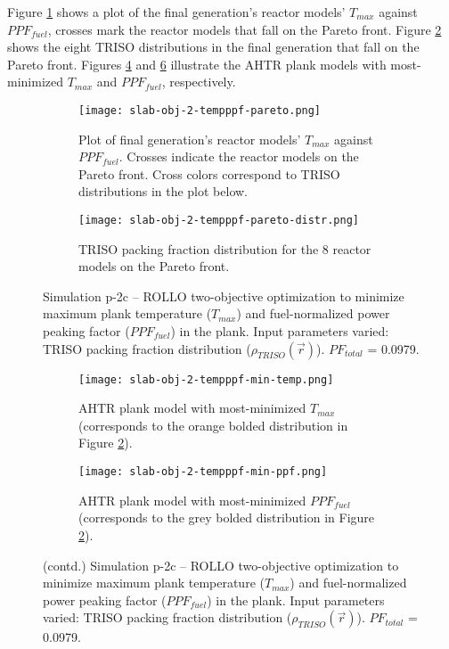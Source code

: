 Figure \ref{fig:slab-obj-2-tempppf-pareto} shows a plot of the final generation's 
reactor models' $T_{max}$ against $PPF_{fuel}$, crosses mark the reactor models that 
fall on the Pareto front.
Figure \ref{fig:slab-obj-2-tempppf-pareto-distr} shows the eight TRISO distributions in 
the final generation that fall on the Pareto front. 
Figures \ref{fig:slab-obj-2-tempppf-min-temp} and \ref{fig:slab-obj-2-tempppf-min-ppf} 
illustrate the \gls{AHTR} plank models with most-minimized $T_{max}$ and 
$PPF_{fuel}$, respectively. 
\begin{figure}[htbp!]
    \centering
    \begin{subfigure}{\textwidth}
        \texttt{[image: slab-obj-2-tempppf-pareto.png]}
        \caption{Plot of final generation's reactor models' $T_{max}$ against 
        $PPF_{fuel}$. Crosses indicate the reactor models on the Pareto front.
        Cross colors correspond to TRISO distributions in the plot below.}
        \label{fig:slab-obj-2-tempppf-pareto} 
    \end{subfigure}
    \begin{subfigure}{\textwidth}
        \texttt{[image: slab-obj-2-tempppf-pareto-distr.png]}
        \caption{TRISO packing fraction distribution for the 8 reactor models on the 
        Pareto front.}
        \label{fig:slab-obj-2-tempppf-pareto-distr} 
    \end{subfigure}
    \caption{Simulation p-2c -- ROLLO two-objective optimization to minimize maximum 
    plank temperature ($T_{max}$) and fuel-normalized power peaking factor 
    ($PPF_{fuel}$) in the plank. 
    Input parameters varied: TRISO packing fraction distribution 
    ($\rho_{TRISO}(\vec{r})$). $PF_{total}$ = 0.0979.}
    \label{fig:slab-obj-2-tempppf}
\end{figure}
\begin{figure}[htbp!]
    \ContinuedFloat
    \begin{subfigure}{\textwidth}
        \texttt{[image: slab-obj-2-tempppf-min-temp.png]}
        \caption{\gls{AHTR} plank model with most-minimized $T_{max}$
        (corresponds to the orange bolded distribution in Figure 
        \ref{fig:slab-obj-2-tempppf-pareto-distr}).}
        \label{fig:slab-obj-2-tempppf-min-temp} 
    \end{subfigure}
    \begin{subfigure}{\textwidth}
        \texttt{[image: slab-obj-2-tempppf-min-ppf.png]}
        \caption{\gls{AHTR} plank model with most-minimized $PPF_{fuel}$
        (corresponds to the grey bolded distribution in Figure 
        \ref{fig:slab-obj-2-tempppf-pareto-distr}).}
        \label{fig:slab-obj-2-tempppf-min-ppf} 
    \end{subfigure}
    \caption{(contd.) Simulation p-2c -- ROLLO two-objective optimization to minimize 
    maximum plank temperature ($T_{max}$) and fuel-normalized power peaking factor 
    ($PPF_{fuel}$) in the plank. 
    Input parameters varied: TRISO packing fraction distribution 
    ($\rho_{TRISO}(\vec{r})$). $PF_{total}$ = 0.0979.}
\end{figure}

